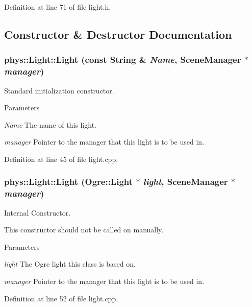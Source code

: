 Definition at line 71 of file light.h.



\subsection{Constructor \& Destructor Documentation}
\hypertarget{classphys_1_1Light_a4bcb13aaf1ab92e7df71b565eeec61e4}{
\subsubsection[{Light}]{\setlength{\rightskip}{0pt plus 5cm}phys::Light::Light (const {\bf String} \& {\em Name}, \/  {\bf SceneManager} $\ast$ {\em manager})}}
\label{dc/df1/classphys_1_1Light_a4bcb13aaf1ab92e7df71b565eeec61e4}


Standard initialization constructor. 


\begin{DoxyParams}{Parameters}
\item[{\em Name}]The name of this light. \item[{\em manager}]Pointer to the manager that this light is to be used in. \end{DoxyParams}


Definition at line 45 of file light.cpp.

\hypertarget{classphys_1_1Light_a27cfdf1933c6b0054aa4ef8348f56daa}{
\subsubsection[{Light}]{\setlength{\rightskip}{0pt plus 5cm}phys::Light::Light (Ogre::Light $\ast$ {\em light}, \/  {\bf SceneManager} $\ast$ {\em manager})}}
\label{dc/df1/classphys_1_1Light_a27cfdf1933c6b0054aa4ef8348f56daa}


Internal Constructor. 

This constructor should not be called on manually. 
\begin{DoxyParams}{Parameters}
\item[{\em light}]The Ogre light this class is based on. \item[{\em manager}]Pointer to the manager that this light is to be used in. \end{DoxyParams}


Definition at line 52 of file light.cpp.



